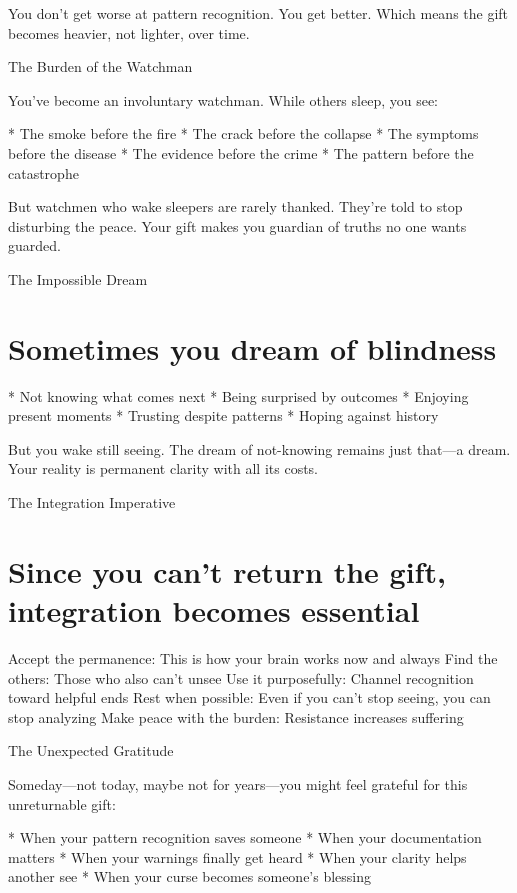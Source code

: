 \documentclass[12pt,oneside]{book}
\begin{document}
You don't get worse at pattern recognition. You get better. Which means the gift becomes heavier, not lighter, over time.

The Burden of the Watchman

You've become an involuntary watchman. While others sleep, you see:

                    * The smoke before the fire
                    * The crack before the collapse
                    * The symptoms before the disease
                    * The evidence before the crime
                    * The pattern before the catastrophe

But watchmen who wake sleepers are rarely thanked. They're told to stop disturbing the peace. Your gift makes you guardian of truths no one wants guarded.

The Impossible Dream

\section{Sometimes you dream of blindness}

                    * Not knowing what comes next
                    * Being surprised by outcomes
                    * Enjoying present moments
                    * Trusting despite patterns
                    * Hoping against history

But you wake still seeing. The dream of not-knowing remains just that---a dream. Your reality is permanent clarity with all its costs.

The Integration Imperative

\section{Since you can't return the gift, integration becomes essential}

Accept the permanence: This is how your brain works now and always Find the others: Those who also can't unsee Use it purposefully: Channel recognition toward helpful ends Rest when possible: Even if you can't stop seeing, you can stop analyzing Make peace with the burden: Resistance increases suffering

The Unexpected Gratitude

Someday---not today, maybe not for years---you might feel grateful for this unreturnable gift:

                    * When your pattern recognition saves someone
                    * When your documentation matters
                    * When your warnings finally get heard
                    * When your clarity helps another see
                    * When your curse becomes someone's blessing
\end{document}
